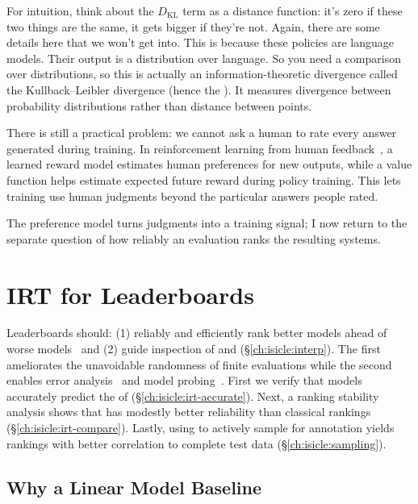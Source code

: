 For intuition, think about the $D_{\mathrm{KL}}$ term as a distance function: it's zero if these two things are the same, it gets bigger if they're not.  Again, there are some details here that we won't get into.  This is because these policies are language models.  Their output is a distribution over language.  So you need a comparison over distributions, so this is actually an information-theoretic divergence called the Kullback--Leibler divergence (hence the ).  It measures divergence between probability distributions rather than distance between points.

There is still a practical problem: we cannot ask a human to rate every answer generated during training.  In reinforcement learning from human feedback~\citep{ouyang-22}, a learned reward model estimates human preferences for new outputs, while a value function helps estimate expected future reward during policy training.  This lets training use human judgments beyond the particular answers people rated.

The preference model turns judgments into a training signal; I now return to the separate question of how reliably an evaluation ranks the resulting systems.

\section{IRT for Leaderboards}
\label{ch:isicle:exp}

Leaderboards should: (1) reliably and efficiently rank
better models ahead of worse
models~\citep{sutcliffe1992pragmatics,voorhees-03} and (2)
guide inspection of \itms{} and \subjs{} (\S\ref{ch:isicle:interp}).
The first ameliorates the unavoidable randomness
of finite evaluations while the second enables
error analysis~\citep{wu2019errudite} and model
probing~\citep{belinkov2019survey,zhang2019manifold}.
First we verify that \irt{} models accurately predict the \resps{} of
\subjs{} (\S\ref{ch:isicle:irt-accurate}).
Next, a ranking stability analysis shows that \irt{} has
modestly better reliability than classical rankings
(\S\ref{ch:isicle:irt-compare}).
Lastly, using \irt{} to actively sample \itms{} for annotation yields
rankings with better correlation to complete test data
(\S\ref{ch:isicle:sampling}).

\subsection{Why a Linear Model Baseline}


